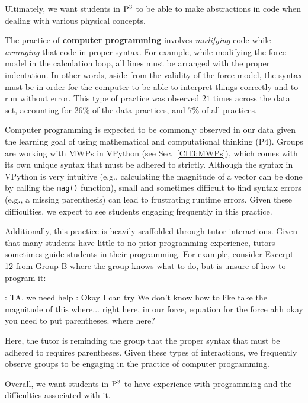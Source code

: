 \documentclass{msuphddissertation}
\begin{document}
\begin{doublespace}
Ultimately, we want students in ${\rm P}^{3}$ to be able to make abstractions in code when dealing with various physical concepts.

The practice of \textbf{computer programming} involves \textit{modifying} code while \textit{arranging} that code in proper syntax.  For example, while modifying the force model in the calculation loop, all lines must be arranged with the proper indentation.  In other words, aside from the validity of the force model, the syntax must be in order for the computer to be able to interpret things correctly and to run without error.  This type of practice was observed $21$ times across the data set, accounting for $26\%$ of the data practices, and $7\%$ of all practices.

Computer programming is expected to be commonly observed in our data given the learning goal of using mathematical and computational thinking (P4).  Groups are working with MWPs in VPython (see Sec.~\ref{CH3:MWPs}), which comes with its own unique syntax that must be adhered to strictly.  Although the syntax in VPython is very intuitive (e.g., calculating the magnitude of a vector can be done by calling the \texttt{mag()} function), small and sometimes difficult to find syntax errors (e.g., a missing parenthesis) can lead to frustrating runtime errors.  Given these difficulties, we expect to see students engaging frequently in this practice.

Additionally, this practice is heavily scaffolded through tutor interactions.  Given that many students have little to no prior programming experience, tutors sometimes guide students in their programming.  For example, consider Excerpt 12 from Group B where the group knows what to do, but is unsure of how to program it: \begin{description}
\SB: TA, we need help
\TA: Okay I can try
\SB We don't know how to like take the magnitude of this
\TA where...
\SB right here, in our force, equation for the force
\TA ahh okay you need to put parentheses.
\SB where here?
\end{description}  Here, the tutor is reminding the group that the proper syntax that must be adhered to requires parentheses.  Given these types of interactions, we frequently observe groups to be engaging in the practice of computer programming.

Overall, we want students in ${\rm P}^{3}$ to have experience with programming and the difficulties associated with it.


\end{doublespace}
\end{document}
